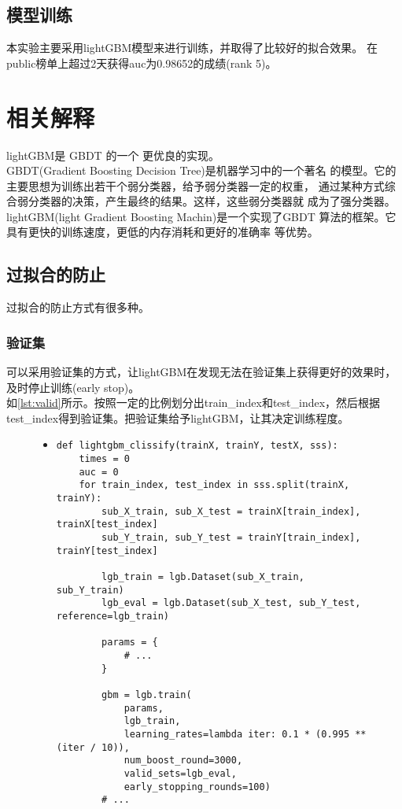 \documentclass[a4paper]{article}
\begin{document}
\subsection{模型训练}\label{subsec:train}
本实验主要采用lightGBM模型来进行训练，并取得了比较好的拟合效果。
在public榜单上超过2天获得auc为0.98652的成绩(rank 5)。
\section{相关解释}
lightGBM是 GBDT  的一个
更优良的实现。\\

GBDT(Gradient Boosting Decision Tree)是机器学习中的一个著名
的模型。它的主要思想为训练出若干个弱分类器，给予弱分类器一定的权重，
通过某种方式综合弱分类器的决策，产生最终的结果。这样，这些弱分类器就
成为了强分类器。\\

lightGBM(light Gradient Boosting Machin)是一个实现了GBDT
算法的框架。它具有更快的训练速度，更低的内存消耗和更好的准确率
等优势。
\subsection{过拟合的防止}
过拟合的防止方式有很多种。
\subsubsection{验证集}
可以采用验证集的方式，让lightGBM在发现无法在验证集上获得更好的效果时，及时停止训练(early stop)。\\

如\autoref{lst:valid}所示。按照一定的比例划分出train\_index和test\_index，然后根据
test\_index得到验证集。把验证集给予lightGBM，让其决定训练程度。

\begin{figure}[!hbt]
\begin{itemize}
\item[] \begin{lstlisting}[style=mypython, label=lst:valid, caption=验证集防止过拟合]
def lightgbm_clissify(trainX, trainY, testX, sss):
    times = 0
    auc = 0
    for train_index, test_index in sss.split(trainX, trainY):
        sub_X_train, sub_X_test = trainX[train_index], trainX[test_index]
        sub_Y_train, sub_Y_test = trainY[train_index], trainY[test_index]

        lgb_train = lgb.Dataset(sub_X_train, sub_Y_train)
        lgb_eval = lgb.Dataset(sub_X_test, sub_Y_test, reference=lgb_train)

        params = {
            # ...
        }

        gbm = lgb.train(
            params, 
            lgb_train, 
            learning_rates=lambda iter: 0.1 * (0.995 ** (iter / 10)),
            num_boost_round=3000, 
            valid_sets=lgb_eval, 
            early_stopping_rounds=100)
        # ...
\end{lstlisting}
\end{itemize}
\end{figure}
\end{document}
